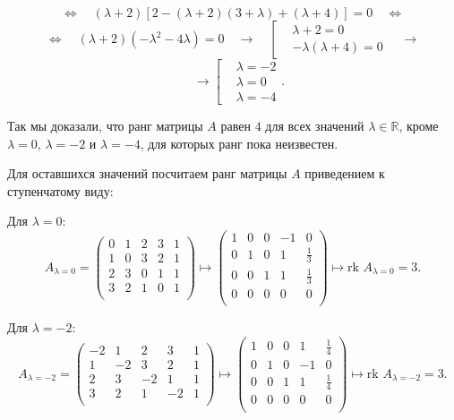 \documentclass[a4paper,12pt]{article}
\begin{document}
$$ \Leftrightarrow \quad
(\lambda+2)[2-(\lambda+2)(3+\lambda)+(\lambda+4)]=0
\quad \Leftrightarrow$$
$$ \Leftrightarrow \quad
(\lambda+2)(-\lambda^2-4\lambda)=0
\quad \longrightarrow \quad
\left[
\begin{aligned}
&\lambda +2 = 0 \\
&-\lambda(\lambda+4)=0
\end{aligned}
\right. \quad \longrightarrow
$$
$$
\quad \longrightarrow
\left[
\begin{aligned}
&\lambda = -2 \\
&\lambda = 0 \\
&\lambda = -4
\end{aligned}
\right.
.$$ \par
Так мы доказали, что ранг матрицы $A$ равен $4$ для всех значений $\lambda \in \mathbb{R}$, кроме $\lambda = 0$, $\lambda = -2$ и $\lambda = - 4$, для которых ранг пока неизвестен.\par
Для оставшихся значений посчитаем ранг матрицы $A$ приведением к ступенчатому виду: \par
Для $\lambda=0$:
$$A_{\lambda=0}=
\begin{pmatrix}
{0}&{1}&{2}&{3}&{1}\\
{1}&{0}&{3}&{2}&{1}\\
{2}&{3}&{0}&{1}&{1}\\
{3}&{2}&{1}&{0}&{1}\\
\end{pmatrix}
\longmapsto
\begin{pmatrix}
{1}&{0}&{0}&{-1}&{0}\\
{0}&{1}&{0}&{1}&{\frac{1}{3}}\\
{0}&{0}&{1}&{1}&{\frac{1}{3}}\\
{0}&{0}&{0}&{0}&{0}\\
\end{pmatrix}
\longmapsto
\text{rk } A_{\lambda=0} = 3.
$$
\par
Для $\lambda=-2$:
$$A_{\lambda=-2}=
\begin{pmatrix}
{-2}&{1}&{2}&{3}&{1}\\
{1}&{-2}&{3}&{2}&{1}\\
{2}&{3}&{-2}&{1}&{1}\\
{3}&{2}&{1}&{-2}&{1}\\
\end{pmatrix}
\longmapsto
\begin{pmatrix}
{1}&{0}&{0}&{1}&{\frac{1}{4}}\\
{0}&{1}&{0}&{-1}&{0}\\
{0}&{0}&{1}&{1}&{\frac{1}{4}}\\
{0}&{0}&{0}&{0}&{0}\\
\end{pmatrix}
\longmapsto
\text{rk } A_{\lambda=-2} = 3.
$$
\end{document}
